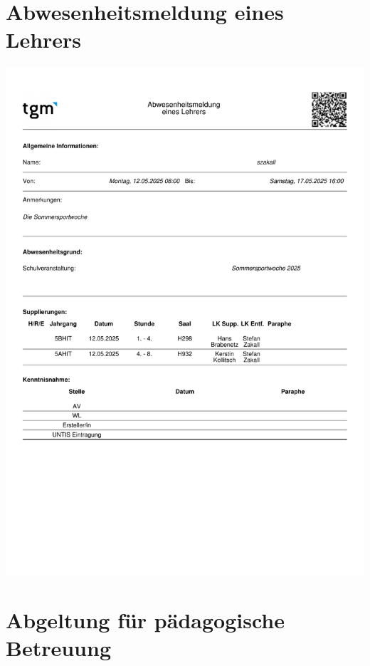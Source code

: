 \section*{Abwesenheitsmeldung eines Lehrers}
{}

%


\begin{center}
	\includegraphics[width=\linewidth]{chapters/appendix/teacher_absence_form_szakall}
\end{center}


\section*{Abgeltung für pädagogische Betreuung}
{}

